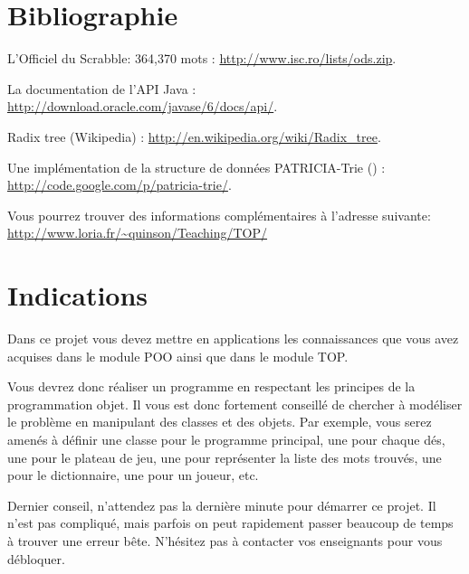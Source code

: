 \documentclass[10pt]{article}
\begin{document}
\section*{Bibliographie}

L'Officiel du Scrabble: 364,370 mots : \url{http://www.isc.ro/lists/ods.zip}.

La documentation de l'API Java : \url{http://download.oracle.com/javase/6/docs/api/}.

Radix tree (Wikipedia) : \url{http://en.wikipedia.org/wiki/Radix_tree}.

Une implémentation de la structure de données PATRICIA-Trie () : \url{http://code.google.com/p/patricia-trie/}.

Vous pourrez trouver des informations complémentaires à l'adresse suivante:\\
\url{http://www.loria.fr/~quinson/Teaching/TOP/}


\section*{Indications}

Dans ce projet vous devez mettre en applications les connaissances que vous
avez acquises dans le module POO ainsi que dans le module TOP.

Vous devrez donc réaliser un programme en respectant les principes de la
programmation objet. Il vous est donc fortement conseillé de chercher à
modéliser le problème en manipulant des classes et des objets. Par exemple,
vous serez amenés à définir une classe pour le programme principal, une pour
chaque dés, une pour le plateau de jeu, une pour représenter la liste des mots
trouvés, une pour le dictionnaire, une pour un joueur, etc.

Dernier conseil, n'attendez pas la dernière minute pour démarrer ce projet. Il
n'est pas compliqué, mais parfois on peut rapidement passer beaucoup de temps à
trouver une erreur bête. N'hésitez pas à contacter vos enseignants pour vous
débloquer.


\end{document}
